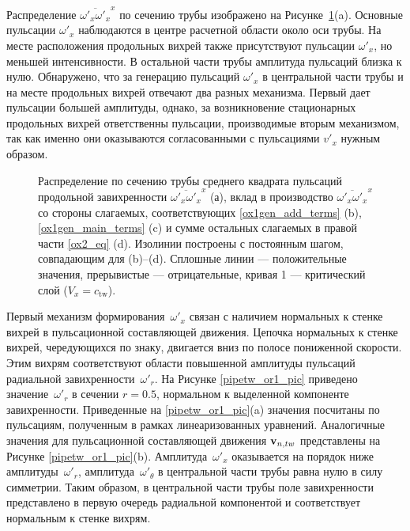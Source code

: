 Распределение $\overline{\omega'_x \omega'_x}^x$ по сечению трубы изображено на Рисунке~\ref{ox1gen_pic}(a). Основные пульсации $\omega'_x$ наблюдаются в центре расчетной области около оси трубы. На месте расположения продольных вихрей также присутствуют пульсации $\omega'_x$, но меньшей интенсивности. В остальной части трубы амплитуда пульсаций близка к нулю. Обнаружено, что за генерацию пульсаций $\omega'_x$ в центральной части трубы и на месте продольных вихрей отвечают два разных механизма. Первый дает пульсации большей амплитуды, однако, за возникновение стационарных продольных вихрей ответственны пульсации, производимые вторым механизмом, так как именно они оказываются согласованными с пульсациями $v'_x$ нужным образом.


\begin{figure}
\caption{Распределение по сечению трубы среднего квадрата пульсаций продольной завихренности $\overline{\omega'_x \omega'_x }^x$ (а), вклад в производство $\overline{\omega'_x \omega'_x }^x$ со стороны слагаемых, соответствующих \eqref{ox1gen_add_terms} (b), \eqref{ox1gen_main_terms} (c) и сумме остальных слагаемых в правой части \eqref{ox2_eq} (d). Изолинии построены с постоянным шагом, совпадающим для (b)--(d). Сплошные линии --- положительные значения, прерывистые --- отрицательные, кривая 1 --- критический слой ($V_x = c_\mathrm{tw}$).}
\label{ox1gen_pic}
\end{figure}


Первый механизм формирования~$\omega'_x$ связан с наличием нормальных к стенке вихрей в пульсационной составляющей движения. Цепочка нормальных к стенке вихрей, чередующихся по знаку, двигается вниз по полосе пониженной скорости. Этим вихрям соответствуют области повышенной амплитуды пульсаций радиальной завихренности~$\omega'_r$. На Рисунке \ref{pipetw_or1_pic} приведено значение~$\omega'_r$ в сечении $r = 0.5$, нормальном к выделенной компоненте завихренности. Приведенные на \ref{pipetw_or1_pic}(a) значения посчитаны по пульсациям, полученным в рамках линеаризованных уравнений. Аналогичные значения для пульсационной составляющей движения $\mathbf{v}_{n,tw}$ представлены на Рисунке \ref{pipetw_or1_pic}(b). Амплитуда~$\omega'_x$ оказывается на порядок ниже амплитуды~$\omega'_r$, амплитуда~$\omega'_\theta$ в центральной части трубы равна нулю в силу симметрии. Таким образом, в центральной части трубы поле завихренности представлено в первую очередь радиальной компонентой и соответствует нормальным к стенке вихрям.

